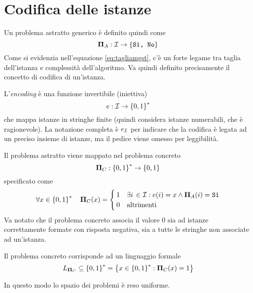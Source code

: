 \section{Codifica delle istanze}
Un problema astratto generico è definito quindi come
\begin{equation*}
    \bm{\Pi}{}_{A} : \mathcal{I}{} \to \left\{ \texttt{Sì, No} \right\}
\end{equation*}
Come si evidenzia nell'equazione \ref{eq:tagliamgst}, c'è un forte legame tra taglia dell'istanza e complessità dell'algoritmo. Va quindi definito precisamente il concetto di codifica di un'istanza.
\begin{definition}\label{def:codifica}
L'\emph{encoding} è una funzione invertibile (iniettiva)
\begin{equation*}
    e : \mathcal{I}{} \to \left\{0,1\right\}^{*}
\end{equation*}
che mappa istanze in stringhe finite (quindi considera istanze numerabili, che è ragionevole). La notazione completa è $e_{\mathcal{I}{}}$ per indicare che la codifica è legata ad un preciso insieme di istanze, ma il pedice viene omesso per leggibilità.
\end{definition}

Il problema astratto viene mappato nel problema concreto
\begin{equation*}
    \bm{\Pi}{}_{C} : \left\{0,1\right\}^{*} \to \left\{0,1\right\}^{}
\end{equation*}
specificato come
\begin{equation*}
    \forall x \in \left\{0,1\right\}^{*} \quad
    \bm{\Pi}{}_{C} (x) =
    \begin{cases}
        1 & \exists i \, \in \mathcal{I}{} : e(i) = x \wedge \bm{\Pi}{}_{A} (i) = \texttt{Sì} \\
        0 & \text{altrimenti}
    \end{cases}
\end{equation*}
Va notato che il problema concreto associa il valore $0$ sia ad istanze correttamente formate con risposta negativa, sia a tutte le stringhe non associate ad un'istanza.

Il problema concreto corrisponde ad un linguaggio formale
\begin{equation*}
    L_{\bm{\Pi}{}_{C}} \subseteq \left\{0,1\right\}^{*} = \left\{ x \in \left\{0,1\right\}^{*} : \bm{\Pi}{}_{C}(x) = 1 \right\}
\end{equation*}

In questo modo lo spazio dei problemi è reso uniforme.

